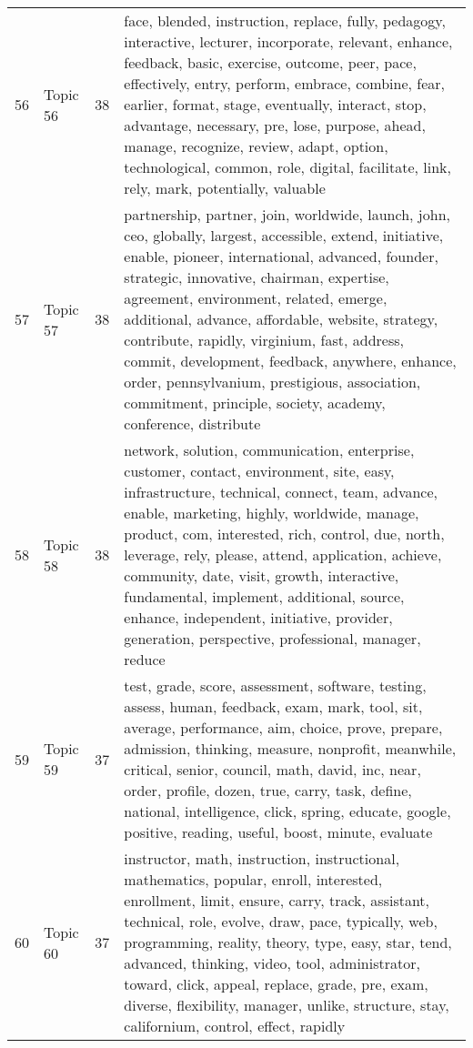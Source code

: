 \begin{table}[ht]
{\begin{tabularx}{\textwidth}{llrX}
   56 & Topic 56 & 38 & face, blended, instruction, replace, fully, pedagogy, interactive, lecturer, incorporate, relevant, enhance, feedback, basic, exercise, outcome, peer, pace, effectively, entry, perform, embrace, combine, fear, earlier, format, stage, eventually, interact, stop, advantage, necessary, pre, lose, purpose, ahead, manage, recognize, review, adapt, option, technological, common, role, digital, facilitate, link, rely, mark, potentially, valuable \\ 
   57 & Topic 57 & 38 & partnership, partner, join, worldwide, launch, john, ceo, globally, largest, accessible, extend, initiative, enable, pioneer, international, advanced, founder, strategic, innovative, chairman, expertise, agreement, environment, related, emerge, additional, advance, affordable, website, strategy, contribute, rapidly, virginium, fast, address, commit, development, feedback, anywhere, enhance, order, pennsylvanium, prestigious, association, commitment, principle, society, academy, conference, distribute \\ 
   58 & Topic 58 & 38 & network, solution, communication, enterprise, customer, contact, environment, site, easy, infrastructure, technical, connect, team, advance, enable, marketing, highly, worldwide, manage, product, com, interested, rich, control, due, north, leverage, rely, please, attend, application, achieve, community, date, visit, growth, interactive, fundamental, implement, additional, source, enhance, independent, initiative, provider, generation, perspective, professional, manager, reduce \\ 
   59 & Topic 59 & 37 & test, grade, score, assessment, software, testing, assess, human, feedback, exam, mark, tool, sit, average, performance, aim, choice, prove, prepare, admission, thinking, measure, nonprofit, meanwhile, critical, senior, council, math, david, inc, near, order, profile, dozen, true, carry, task, define, national, intelligence, click, spring, educate, google, positive, reading, useful, boost, minute, evaluate \\ 
   60 & Topic 60 & 37 & instructor, math, instruction, instructional, mathematics, popular, enroll, interested, enrollment, limit, ensure, carry, track, assistant, technical, role, evolve, draw, pace, typically, web, programming, reality, theory, type, easy, star, tend, advanced, thinking, video, tool, administrator, toward, click, appeal, replace, grade, pre, exam, diverse, flexibility, manager, unlike, structure, stay, californium, control, effect, rapidly \\ 

\end{tabularx}}
\end{table}
